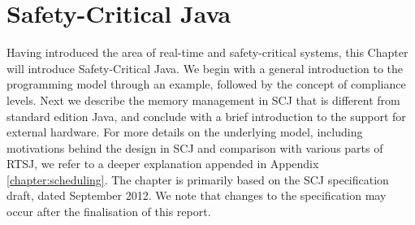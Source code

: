 \chapter{Safety-Critical Java}
\label{chapter:scj}
Having introduced the area of real-time and safety-critical systems, this Chapter will introduce Safety-Critical Java. We begin with a general introduction to the programming model through an example, followed by the concept of compliance levels. Next we describe the memory management in SCJ that is different from standard edition Java, and conclude with a brief introduction to the support for external hardware. For more details on the underlying model, including motivations behind the design in SCJ and comparison with various parts of RTSJ, we refer to a deeper explanation appended in Appendix \ref{chapter:scheduling}.
 The chapter is primarily based on the SCJ specification draft, dated September 2012\cite{SCJSpec}. We note that changes to the specification may occur after the finalisation of this report.